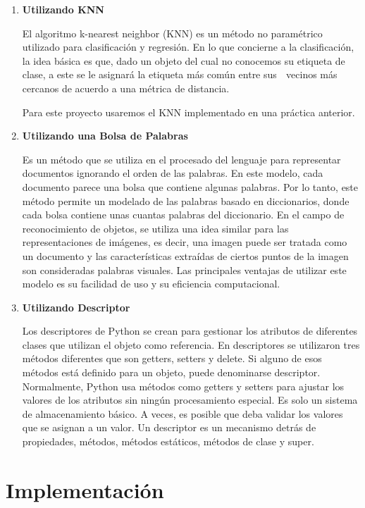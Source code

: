 \documentclass{article}
\begin{document}
\begin{enumerate}
  \item \textbf{Utilizando KNN}
  
  El algoritmo k-nearest neighbor (KNN) es un método no paramétrico utilizado para clasificación y regresión. En lo que concierne a la clasificación, la idea básica  es  que,  dado  un  objeto del cual no conocemos su etiqueta de clase, a este se le asignará la etiqueta más común entre sus  vecinos más cercanos de acuerdo a una métrica de distancia.

  Para este proyecto usaremos el KNN implementado en una práctica anterior.

  \item \textbf{Utilizando una Bolsa de Palabras}

  Es un método que se utiliza en el procesado del lenguaje para representar documentos ignorando el orden de las palabras. En este modelo, cada documento parece una bolsa que contiene algunas palabras. Por lo tanto, este método permite un modelado de las palabras basado en diccionarios, donde cada bolsa contiene unas cuantas palabras del diccionario. En el campo de reconocimiento de objetos, se utiliza una idea similar para las representaciones de imágenes, es decir, una imagen puede ser tratada como un documento y las características extraídas de ciertos puntos de la imagen son consideradas palabras visuales. Las principales ventajas de utilizar este modelo es su facilidad de uso y su eficiencia computacional.

  \item \textbf{Utilizando Descriptor}

  Los descriptores de Python se crean para gestionar los atributos de diferentes clases que utilizan el objeto como referencia. En descriptores se utilizaron tres métodos diferentes que son getters, setters y delete. Si alguno de esos métodos está definido para un objeto, puede denominarse descriptor. Normalmente, Python usa métodos como getters y setters para ajustar los valores de los atributos sin ningún procesamiento especial. Es solo un sistema de almacenamiento básico. A veces, es posible que deba validar los valores que se asignan a un valor. Un descriptor es un mecanismo detrás de propiedades, métodos, métodos estáticos, métodos de clase y super.

\end{enumerate}

\section{Implementación}
\end{document}
